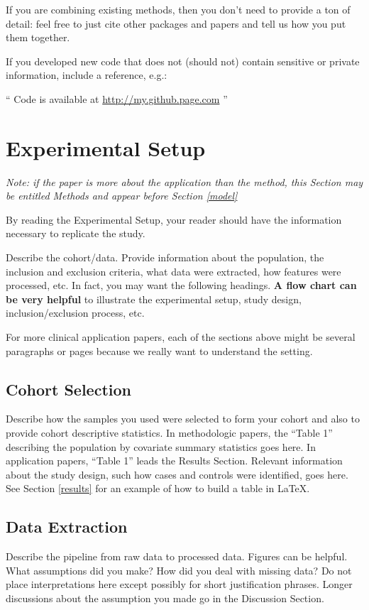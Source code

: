 \documentclass[twoside,11pt]{article}
\begin{document}
If you are combining existing methods, then you don't need to provide a ton of detail: feel free to just cite other packages and papers and tell us how you put them together.  

If you developed new code that does not (should not) contain sensitive or private information, include a reference, e.g.:

`` Code is available at \url{http://my.github.page.com} ''

\section{Experimental Setup} \label{experiment}
\emph{Note: if the paper is more about the application than the method, this Section may be entitled Methods and appear before Section \ref{model}}

By reading the Experimental Setup, your reader should have the information necessary to replicate the study.

Describe the cohort/data. Provide information about the population, the inclusion and exclusion criteria, what data were extracted, how features were processed, etc. In fact, you may want the following headings. \textbf{A flow chart can be very helpful} to illustrate the experimental setup, study design, inclusion/exclusion process, etc.

For more clinical application papers, each of the sections above might be several paragraphs or pages because we really want to understand the setting.

\subsection{Cohort Selection} 
Describe how the samples you used were selected to form your cohort and also to provide cohort descriptive statistics. In methodologic papers, the ``Table 1'' describing the population by covariate summary statistics goes here. In application papers, ``Table 1'' leads the Results Section. Relevant information about the study design, such how cases and controls were identified, goes here. See Section \ref{results} for an example of how to build a table in LaTeX.

\subsection{Data Extraction} 
Describe the pipeline from raw data to processed data. Figures can be helpful. What assumptions did you make? How did you deal with missing data? Do not place interpretations here except possibly for short justification phrases. Longer discussions about the assumption you made go in the Discussion Section.
\end{document}
